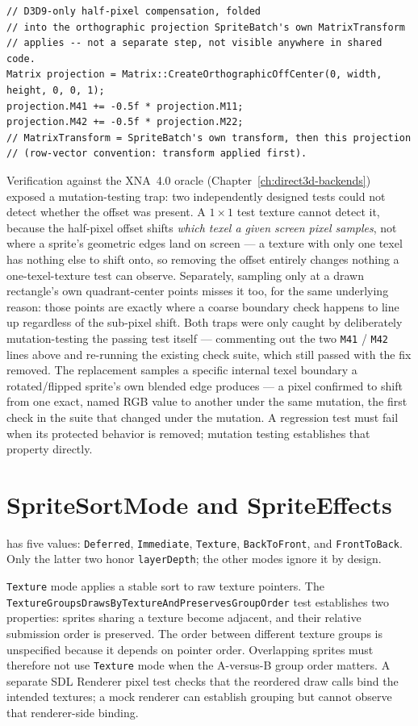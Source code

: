 \begin{lstlisting}
// D3D9-only half-pixel compensation, folded
// into the orthographic projection SpriteBatch's own MatrixTransform
// applies -- not a separate step, not visible anywhere in shared code.
Matrix projection = Matrix::CreateOrthographicOffCenter(0, width, height, 0, 0, 1);
projection.M41 += -0.5f * projection.M11;
projection.M42 += -0.5f * projection.M22;
// MatrixTransform = SpriteBatch's own transform, then this projection
// (row-vector convention: transform applied first).
\end{lstlisting}

Verification against the XNA~4.0 oracle (Chapter~\ref{ch:direct3d-backends}) exposed a
mutation-testing trap: two independently designed tests could not detect whether the offset
was present. A $1\times1$ test texture
cannot detect it, because the half-pixel offset shifts \emph{which texel a given screen pixel
samples}, not where a sprite's geometric edges land on screen --- a texture with only one texel
has nothing else to shift onto, so removing the offset entirely changes nothing a
one-texel-texture test can observe. Separately, sampling only at a drawn rectangle's own
quadrant-center points misses it too, for the same underlying reason: those points are exactly
where a coarse boundary check happens to line up regardless of the sub-pixel shift. Both traps
were only caught by deliberately mutation-testing the passing test itself --- commenting out
the two \texttt{M41} / \texttt{M42} lines above and re-running the existing check suite, which
still passed with the fix removed. The replacement samples a specific
internal texel boundary a rotated/flipped sprite's own blended edge produces --- a pixel
confirmed to shift from one exact, named RGB value to another under the same mutation, the
first check in the suite that changed under the mutation. A regression test must fail when its
protected behavior is removed; mutation testing establishes that property directly.

\section{SpriteSortMode and SpriteEffects}

 has five values: \texttt{Deferred}, \texttt{Immediate},
\texttt{Texture}, \texttt{BackToFront}, and \texttt{FrontToBack}. Only the latter two honor
\texttt{layerDepth}; the other modes ignore it by design.

\texttt{Texture} mode applies a stable sort to raw texture pointers. The
\texttt{TextureGroupsDrawsByTextureAnd\allowbreak{}PreservesGroupOrder} test establishes two properties:
sprites sharing a texture become adjacent, and their relative submission order is preserved.
The order between different texture groups is unspecified because it depends on pointer order.
Overlapping sprites must therefore not use \texttt{Texture} mode when the A-versus-B group order
matters. A separate SDL Renderer pixel test checks that the reordered draw calls bind the intended
textures; a mock renderer can establish grouping but cannot observe that renderer-side binding.


